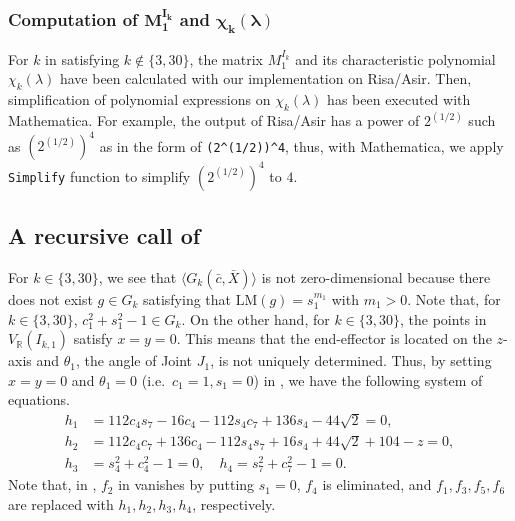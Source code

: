 \documentclass{birkjour}
\theoremstyle{plain}
\theoremstyle{definition}
\newcommand{\R}[0]{\mathbb{R}}
\newcommand{\cbar}[0]{\bar{c}}
\newcommand{\Xbar}{\bar{X}}
\newcommand{\lm}{\mathrm{LM}}
\begin{document}
    \subsubsection{Computation of $\bm{M_1^{I_{k}}}$ and $\bm{\chi_k(\lambda)}$}

    For $k$ in  satisfying $k\not\in\{3,30\}$,
    the matrix $M_1^{I_{k}}$ and its characteristic polynomial 
    $\chi_{k}(\lambda)$ have been calculated with our implementation on Risa/Asir.
    Then, simplification of polynomial expressions on $\chi_{k}(\lambda)$ 
    has been executed with Mathematica. 
    For example, the output of Risa/Asir has a power of $2^{(1/2)}$ such as 
    $(2^{(1/2)})^4$ as in the form of \verb|(2^(1/2))^4|, thus,
    with Mathematica, we apply \texttt{Simplify} function to simplify $(2^{(1/2)})^4$ to $4$.

    \subsection{A recursive call of }
    \label{sec:preprocessing-sub}

    For $k\in\{3,30\}$, we see that $\langle G_{k}(\cbar,\Xbar)\rangle$ is not zero-dimensional because there does not exist $g\in G_k$ satisfying that $\lm(g)=s_1^{m_1}$ with $m_1>0$.
    Note that, for $k\in\{3,30\}$, $c_1^2+s_1^2-1\in G_k$. On the other hand, for $k\in\{3,30\}$,
    the points in $V_{\R}(I_{k,1})$ satisfy $x=y=0$. This means that the end-effector is located
    on the $z$-axis and $\theta_1$, the angle of Joint $J_1$, is not uniquely determined. 
    Thus, by setting $x=y=0$ and $\theta_1=0$ (i.e.\ $c_1=1,s_1=0$) in
    , we have 
    the following system of equations.
    \begin{equation}
        \label{eq:system-H}
        \begin{split}
           h_1 &= 112c_4s_7-16c_4-112s_4c_7+136s_4-44\sqrt{2}  = 0,\\
           h_2 &= 112c_4c_7+136c_4-112s_4s_7+16s_4+44\sqrt{2}+104-z=0,\\
           h_3 &= s_4^2+c_4^2-1=0,\quad h_4=s_7^2+c_7^2-1=0.
        \end{split}
    \end{equation}
    Note that, in , $f_2$ in  vanishes by putting $s_1=0$, $f_4$ is eliminated, and $f_1,f_3,f_5,f_6$ are replaced with $h_1,h_2,h_3,h_4$,
    respectively.
\end{document}
